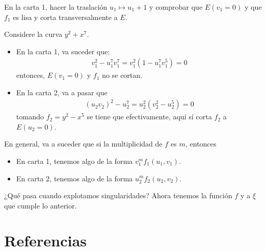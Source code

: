 \documentclass[12pt]{report}
\newcounter{it}
\theoremstyle{largebreak}
\begin{document}
    \begin{excer}
        En la carta 1, hacer la traslación $u_1\mapsto u_1+1$ y comprobar que $E(v_1=0)$ y que $f_1$ es lisa y corta transversalmente a $E$.
    \end{excer}

    \begin{exa}
        Considere la curva $y^2+x^7$.
        \begin{itemize}
            \item En la carta 1, va suceder que:
            \begin{equation*}
                \begin{split}
                    v_1^2-u_1^7v_1^7=v_1^2(1-u_1^7v_1^5)=0
                \end{split}
            \end{equation*}
            entonces, $E(v_1=0)$ y $f_1$ no se cortan.
            \item En la carta 2, va a pasar que
            \begin{equation*}
                \begin{split}
                    (u_2v_2)^2-u_2^7=u_2^2(v_2^2-u_2^5)=0
                \end{split}
            \end{equation*}
            tomando $f_2=y^2-x^5$ se tiene que efectivamente, aquí sí corta $f_2$ a $E(u_2=0)$.
        \end{itemize}
    \end{exa}

    \begin{obs}
        En general, va a suceder que si la multiplicidad de $f$ es $m$, entonces
        \begin{itemize}
            \item En carta 1, tenemos algo de la forma $v_1^mf_1(u_1,v_1)$.
            \item En carta 2, tenemos algo de la forma $u_2^mf_2(u_2,v_2)$.
        \end{itemize}
    \end{obs}

    ¿Qué pasa cuando explotamos singularidades? Ahora tenemos la función $f$ y a $\xi$ que cumple lo anterior.

    \newpage

    \section{Referencias}
\end{document}
